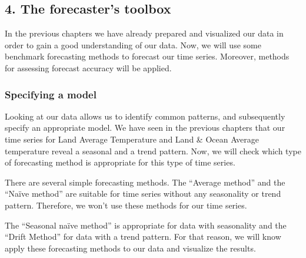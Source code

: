 \documentclass[
]{article}
\begin{document}
\hypertarget{the-forecasters-toolbox}{%
\subsection{4. The forecaster's toolbox}\label{the-forecasters-toolbox}}

In the previous chapters we have already prepared and visualized our
data in order to gain a good understanding of our data. Now, we will use
some benchmark forecasting methods to forecast our time series.
Moreover, methods for assessing forecast accuracy will be applied.

\hypertarget{specifying-a-model}{%
\subsubsection{Specifying a model}\label{specifying-a-model}}

Looking at our data allows us to identify common patterns, and
subsequently specify an appropriate model. We have seen in the previous
chapters that our time series for Land Average Temperature and Land \&
Ocean Average temperature reveal a seasonal and a trend pattern. Now, we
will check which type of forecasting method is appropriate for this type
of time series.

There are several simple forecasting methods. The ``Average method'' and
the ``Naïve method'' are suitable for time series without any
seasonality or trend pattern. Therefore, we won't use these methods for
our time series.

The ``Seasonal naïve method'' is appropriate for data with seasonality
and the ``Drift Method'' for data with a trend pattern. For that reason,
we will know apply these forecasting methods to our data and visualize
the results.
\end{document}
